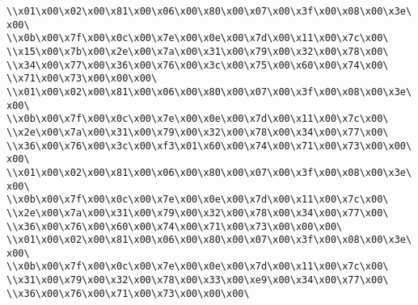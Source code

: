 \verb|\\x01\x00\x02\x00\x81\x00\x06\x00\x80\x00\x07\x00\x3f\x00\x08\x00\x3e\x00\|\newline
\verb|\\x0b\x00\x7f\x00\x0c\x00\x7e\x00\x0e\x00\x7d\x00\x11\x00\x7c\x00\|\newline
\verb|\\x15\x00\x7b\x00\x2e\x00\x7a\x00\x31\x00\x79\x00\x32\x00\x78\x00\|\newline
\verb|\\x34\x00\x77\x00\x36\x00\x76\x00\x3c\x00\x75\x00\x60\x00\x74\x00\|\newline
\verb|\\x71\x00\x73\x00\x00\x00\|\newline
\verb|\\x01\x00\x02\x00\x81\x00\x06\x00\x80\x00\x07\x00\x3f\x00\x08\x00\x3e\x00\|\newline
\verb|\\x0b\x00\x7f\x00\x0c\x00\x7e\x00\x0e\x00\x7d\x00\x11\x00\x7c\x00\|\newline
\verb|\\x2e\x00\x7a\x00\x31\x00\x79\x00\x32\x00\x78\x00\x34\x00\x77\x00\|\newline
\verb|\\x36\x00\x76\x00\x3c\x00\xf3\x01\x60\x00\x74\x00\x71\x00\x73\x00\x00\x00\|\newline
\verb|\\x01\x00\x02\x00\x81\x00\x06\x00\x80\x00\x07\x00\x3f\x00\x08\x00\x3e\x00\|\newline
\verb|\\x0b\x00\x7f\x00\x0c\x00\x7e\x00\x0e\x00\x7d\x00\x11\x00\x7c\x00\|\newline
\verb|\\x2e\x00\x7a\x00\x31\x00\x79\x00\x32\x00\x78\x00\x34\x00\x77\x00\|\newline
\verb|\\x36\x00\x76\x00\x60\x00\x74\x00\x71\x00\x73\x00\x00\x00\|\newline
\verb|\\x01\x00\x02\x00\x81\x00\x06\x00\x80\x00\x07\x00\x3f\x00\x08\x00\x3e\x00\|\newline
\verb|\\x0b\x00\x7f\x00\x0c\x00\x7e\x00\x0e\x00\x7d\x00\x11\x00\x7c\x00\|\newline
\verb|\\x31\x00\x79\x00\x32\x00\x78\x00\x33\x00\xe9\x00\x34\x00\x77\x00\|\newline
\verb|\\x36\x00\x76\x00\x71\x00\x73\x00\x00\x00\|\newline
